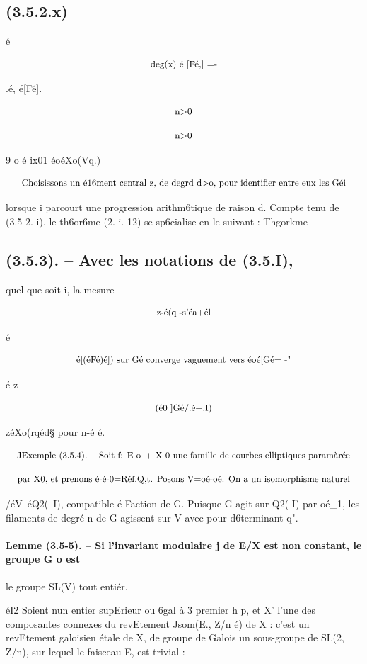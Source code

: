 \documentclass[11pt]{article}
\theoremstyle{remark}
\begin{document}
\subsection*{(3.5.2.x)}

é

\[\text{\small deg(x) é [Fé,] =-}\]

.é, é[Fé].

\[\text{\small n>0}\]

\[\text{\small n>0}\]

9 o é ix01 éoéXo(Vq.)

\[\text{\small Choisissons un é16ment central z, de degrd d>o, pour identifier entre eux les Géi}\]

lorsque i parcourt une progression arithm6tique de raison d. Compte tenu de (3.5-2. i), le th6or6me (2. i. 12) se sp6cialise en le suivant : Thgorkme

\subsection*{(3.5.3). -- Avec les notations de (3.5.I),}

quel que soit i, la mesure

\[\text{\small z-é(q -s'éa+él}\]

é

\[\text{\small é[(éFé)é]) sur Gé converge vaguement vers éoé[Gé= -"}\]

é z

\[\text{\small (é0 ]Gé/.é+,I)}\]

zéXo(rqéd§ pour n-é é.

\[\text{\small JExemple (3.5.4). -- Soit f: E o--+ X 0 une famille de courbes elliptiques paramàrée}\]

\[\text{\small par X0, et prenons é-é-0=Réf.Q,t. Posons V=oé-oé. On a un isomorphisme naturel}\]

/éV--éQ2(--I), compatible é Faction de G. Puisque G agit sur Q2(-I) par oé\_1, les filaments de degré n de G agissent sur V avec pour d6terminant q".

\paragraph{Lemme (3.5-5). -- Si l'invariant modulaire j de E/X est non constant, le groupe G o est}

le groupe SL(V) tout entiér.

éI2 Soient nun entier supErieur ou 6gal à 3 premier h p, et X' l'une des composantes connexes du revEtement Jsom(E., Z/n é) de X : c'est un revEtement galoisien étale de X, de groupe de Galois un sous-groupe de SL(2, Z/n), sur lcquel le faisceau E, est trivial :
\end{document}
